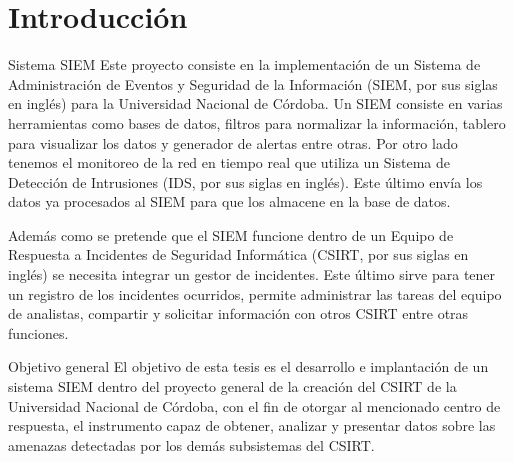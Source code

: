\chapter{Introducción}
    \begin{section}{Sistema SIEM}
        Este proyecto consiste en la implementación de un Sistema de Administración de Eventos y Seguridad de la Información (SIEM, por sus siglas en inglés) para la Universidad Nacional de Córdoba. Un SIEM consiste en varias herramientas como bases de datos, filtros para normalizar la información, tablero para visualizar los datos y generador de alertas entre otras. Por otro lado tenemos el monitoreo de la red en tiempo real que utiliza un Sistema de Detección de Intrusiones (IDS, por sus siglas en inglés). Este último envía los datos ya procesados al SIEM para que los almacene en la base de datos. \par
        Además como se pretende que el SIEM funcione dentro de un Equipo de Respuesta a Incidentes de Seguridad Informática (CSIRT, por sus siglas en inglés) se necesita integrar un gestor de incidentes. Este último sirve para tener un registro de los incidentes ocurridos, permite administrar las tareas del equipo de analistas, compartir y solicitar información con otros CSIRT entre otras funciones.
    \end{section}
    \begin{section}{Objetivo general}
        El objetivo de esta tesis es el desarrollo e implantación de un sistema SIEM dentro del proyecto general de la creación del CSIRT de la Universidad Nacional de Córdoba, con el fin de otorgar al mencionado centro de respuesta, el instrumento capaz de obtener, analizar y presentar datos sobre las amenazas detectadas por los demás subsistemas del CSIRT.
    \end{section}
    
